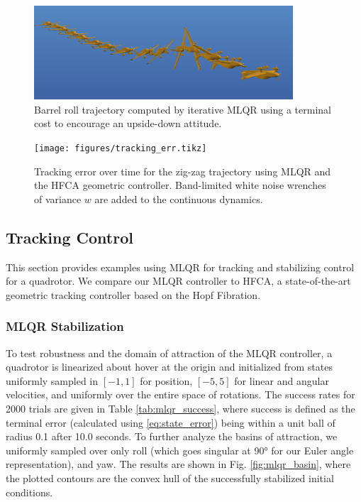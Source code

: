 \documentclass{svproc}
\begin{document}
        \begin{figure}[h]
            \centering
            \includegraphics[height=3.5cm]{figures/barrellroll.png}
            \caption{Barrel roll trajectory computed by iterative MLQR using a terminal cost to encourage an upside-down attitude.}
            \label{fig:barrellroll}
        \end{figure}
    
	    \begin{figure}[h]
	        \centering
	        \texttt{[image: figures/tracking\_err.tikz]}
	        \caption{Tracking error over time for the zig-zag trajectory using MLQR and the HFCA geometric controller. Band-limited white noise wrenches of variance $w$ are added to the continuous dynamics. }
	        \label{fig:tracking_err}
	    \end{figure}
	    \vspace{-20pt}
	    
	\subsection{Tracking Control}
	   
	    This section provides examples using MLQR for tracking and stabilizing control for a quadrotor. We compare our MLQR controller to HFCA, a state-of-the-art geometric tracking controller \cite{watterson2020control} based on the Hopf Fibration. 
	    
	    \subsubsection{MLQR Stabilization}
	    To test robustness and the domain of attraction of the MLQR controller, a quadrotor is linearized about hover at the origin and initialized from states uniformly sampled in $[-1,1]$ for position, $[-5,5]$ for linear and angular velocities, and uniformly over the entire space of rotations. The success rates for 2000 trials are given in Table \ref{tab:mlqr_success}, where success is defined as the terminal error (calculated using \eqref{eq:state_error}) being within a unit ball of radius 0.1 after 10.0 seconds.
	    To further analyze the basins of attraction, we uniformly sampled over only roll (which goes singular at \ang{90} for our Euler angle representation), and yaw. The results are shown in Fig. \ref{fig:mlqr_basin}, where the plotted contours are the convex hull of the successfully stabilized initial conditions.
	    
\end{document}
